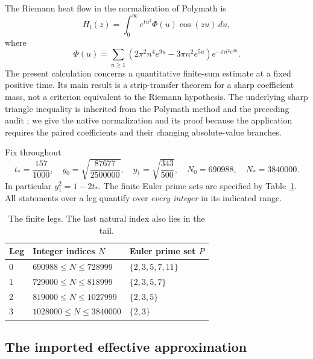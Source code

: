 \documentclass[11pt]{article}
\theoremstyle{remark}
\newcommand{\tstar}{t_*}
\newcommand{\Nzero}{N_0}
\newcommand{\Nstar}{N_*}
\numberwithin{equation}{section}
\begin{document}
The Riemann heat flow in the normalization of Polymath \cite{polymath} is
\begin{equation}\label{eq:H}
 H_t(z)=\int_0^\infty e^{tu^2}\Phi(u)\cos(zu)\,du,
\end{equation}
where
\[
 \Phi(u)=\sum_{n\ge1}
 (2\pi^2n^4e^{9u}-3\pi n^2e^{5u})e^{-\pi n^2e^{4u}}.
\]
The present calculation concerns a quantitative finite-sum estimate at a
fixed positive time. Its main result is a strip-transfer theorem for a
sharp coefficient mass, not a criterion equivalent to the Riemann
hypothesis. The underlying sharp triangle inequality is inherited from
the Polymath method and the preceding audit \cite[Section 8.5]{polymath}\cite{audit3,sharpreview};
we give the native normalization and its proof because the application
requires the paired coefficients and their changing absolute-value branches.

Fix throughout
\begin{equation}\label{eq:parameters}
 \tstar=\frac{157}{1000},\quad
 y_0=\sqrt{\frac{87677}{2500000}},\quad
 y_1=\sqrt{\frac{343}{500}},\quad
 \Nzero=690988,\quad \Nstar=3840000.
\end{equation}
In particular $y_1^2=1-2\tstar$. The finite Euler prime sets are
specified by Table~\ref{tab:legs}. All statements over a leg quantify over
\emph{every integer} in its indicated range.

\begin{table}[htbp]
\centering
\begin{tabular}{lll}
\toprule
Leg & Integer indices $N$ & Euler prime set $P$\\
\midrule
0 & $690988\le N\le728999$ & $\{2,3,5,7,11\}$\\
1 & $729000\le N\le818999$ & $\{2,3,5,7\}$\\
2 & $819000\le N\le1027999$ & $\{2,3,5\}$\\
3 & $1028000\le N\le3840000$ & $\{2,3\}$\\
\bottomrule
\end{tabular}
\caption{The finite legs. The last natural index also lies in the tail.}
\label{tab:legs}
\end{table}

\subsection{The imported effective approximation}
\end{document}
